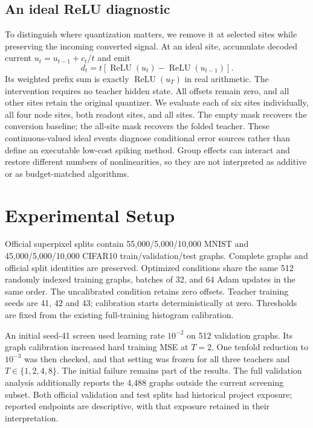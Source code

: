 \documentclass[10pt,twocolumn]{article}
\begin{document}
\subsection{An ideal ReLU diagnostic}
To distinguish where quantization matters, we remove it at selected sites while preserving the incoming converted signal. At an ideal site, accumulate decoded current $u_t=u_{t-1}+c_t/t$ and emit
\begin{equation}
 d_t=t[\operatorname{ReLU}(u_t)-\operatorname{ReLU}(u_{t-1})].
\end{equation}
Its weighted prefix sum is exactly $\operatorname{ReLU}(u_T)$ in real arithmetic. The intervention requires no teacher hidden state. All offsets remain zero, and all other sites retain the original quantizer. We evaluate each of six sites individually, all four node sites, both readout sites, and all sites. The empty mask recovers the conversion baseline; the all-site mask recovers the folded teacher. These continuous-valued ideal events diagnose conditional error sources rather than define an executable low-cost spiking method. Group effects can interact and restore different numbers of nonlinearities, so they are not interpreted as additive or as budget-matched algorithms.

\section{Experimental Setup}
Official superpixel splits contain 55,000/5,000/10,000 MNIST and 45,000/5,000/10,000 CIFAR10 train/validation/test graphs. Complete graphs and official split identities are preserved. Optimized conditions share the same 512 randomly indexed training graphs, batches of 32, and 64 Adam updates in the same order. The uncalibrated condition retains zero offsets. Teacher training seeds are 41, 42 and 43; calibration starts deterministically at zero. Thresholds are fixed from the existing full-training histogram calibration.

An initial seed-41 screen used learning rate $10^{-2}$ on 512 validation graphs. Its graph calibration increased hard training MSE at $T=2$. One tenfold reduction to $10^{-3}$ was then checked, and that setting was frozen for all three teachers and $T\in\{1,2,4,8\}$. The initial failure remains part of the results. The full validation analysis additionally reports the 4,488 graphs outside the current screening subset. Both official validation and test splits had historical project exposure; reported endpoints are descriptive, with that exposure retained in their interpretation.
\end{document}
